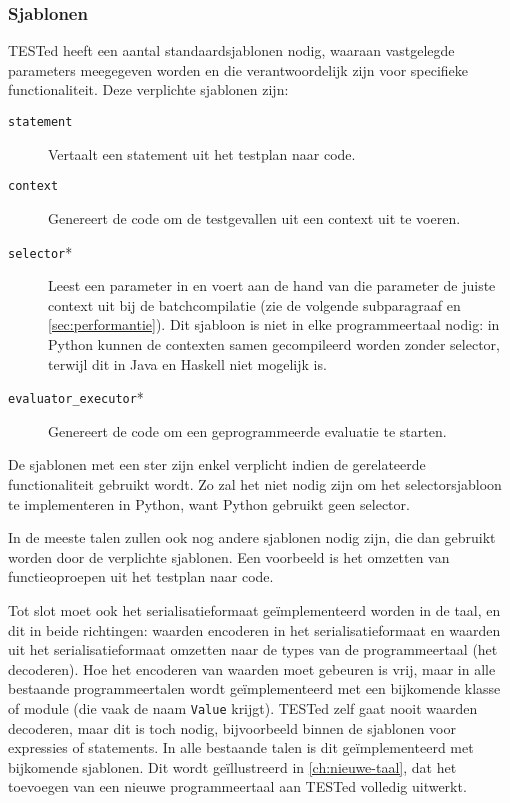 \subsubsection{Sjablonen}

TESTed heeft een aantal standaardsjablonen nodig, waaraan vastgelegde parameters meegegeven worden en die verantwoordelijk zijn voor specifieke functionaliteit.
Deze verplichte sjablonen zijn:

\begin{description}
    \item[\texttt{statement}] Vertaalt een statement uit het testplan naar code.
    \item[\texttt{context}] Genereert de code om de testgevallen uit een context uit te voeren.
    \item[\texttt{selector}*] Leest een parameter in en voert aan de hand van die parameter de juiste context uit bij de batchcompilatie (zie de volgende subparagraaf en \cref{sec:performantie}).
    Dit sjabloon is niet in elke programmeertaal nodig: in Python kunnen de contexten samen gecompileerd worden zonder selector, terwijl dit in Java en Haskell niet mogelijk is.
    \item[\texttt{evaluator\_executor}*] Genereert de code om een geprogrammeerde evaluatie te starten.
\end{description}

De sjablonen met een ster zijn enkel verplicht indien de gerelateerde functionaliteit gebruikt wordt.
Zo zal het niet nodig zijn om het selectorsjabloon te implementeren in Python, want Python gebruikt geen selector.

In de meeste talen zullen ook nog andere sjablonen nodig zijn, die dan gebruikt worden door de verplichte sjablonen.
Een voorbeeld is het omzetten van functieoproepen uit het testplan naar code.

Tot slot moet ook het serialisatieformaat geïmplementeerd worden in de taal, en dit in beide richtingen: waarden encoderen in het serialisatieformaat en waarden uit het serialisatieformaat omzetten naar de types van de programmeertaal (het decoderen).
Hoe het encoderen van waarden moet gebeuren is vrij, maar in alle bestaande programmeertalen wordt geïmplementeerd met een bijkomende klasse of module (die vaak de naam \texttt{Value} krijgt).
TESTed zelf gaat nooit waarden decoderen, maar dit is toch nodig, bijvoorbeeld binnen de sjablonen voor expressies of statements.
In alle bestaande talen is dit geïmplementeerd met bijkomende sjablonen.
Dit wordt geïllustreerd in \cref{ch:nieuwe-taal}, dat het toevoegen van een nieuwe programmeertaal aan TESTed volledig uitwerkt.

